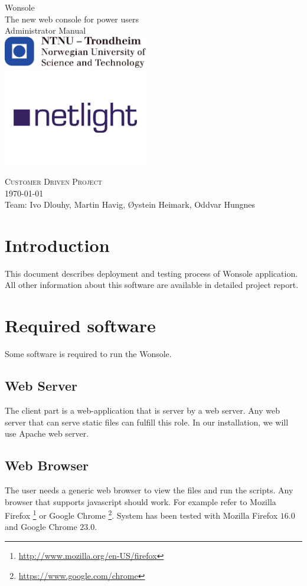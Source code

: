 \thispagestyle{empty}
\begin{center}
	{\Huge Wonsole} \\
	\medskip
	{\LARGE The new web console for power users} \\ 
	\bigskip
	{\Huge Administrator Manual} \\ 
	\includegraphics[width=2.5in]{image/logo-ntnu.pdf} \\
	\includegraphics[width=2.5in]{image/logo-netlight.png}
\end{center}
{\Large \textsc{Customer Driven Project}} \\
{\large \today \\Team: Ivo Dlouhy, Martin Havig, Øystein Heimark, Oddvar Hungnes}
\newpage


\setcounter{tocdepth}{1}
\tableofcontents
\clearpage
\chapter{Introduction}
This document describes deployment and testing process of Wonsole application.
All other information about this software are available in detailed project
report.
\chapter{Required software}
Some software is required to run the Wonsole. 
\section{Web Server}
The client part is a web-application that is server by a web server. Any web
server that can serve static files can fulfill this role. In our installation,
we will use Apache web server.

\section{Web Browser}
The user needs a generic web browser to view the files and run the scripts. Any
browser that supports javascript should work. For example refer to Mozilla
Firefox \footnote{\url{http://www.mozilla.org/en-US/firefox}} or Google Chrome
\footnote{\url{https://www.google.com/chrome}}. System has been tested with
Mozilla Firefox $16.0$ and Google Chrome $23.0$. 

